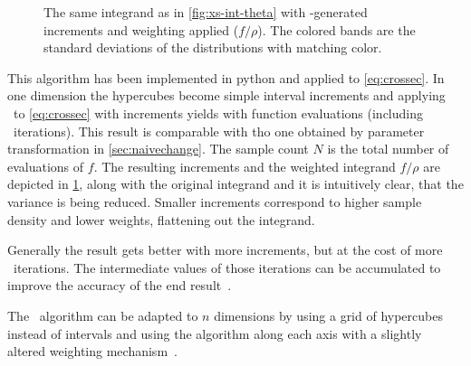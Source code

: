 \begin{figure}[ht]
  \centering {}
  \caption[\(2\pi\dv{\sigma}{\theta}\) scaled to increments found by
  \vegas\ ]{\label{fig:xs-int-vegas} The same integrand as in
    \cref{fig:xs-int-theta} with \vegas-generated increments and
    weighting applied (\(f/\rho\)). The colored bands are the standard
    deviations of the distributions with matching color.}
\end{figure}
%
This algorithm has been implemented in python and applied to
\cref{eq:crossec}.  In one dimension the hypercubes become simple
interval increments and applying \vegas\ to \cref{eq:crossec} with
 increments yields
 with
 function evaluations (including
\vegas\ iterations). This result is comparable with tho one obtained
by parameter transformation in \cref{sec:naivechange}.  The sample
count \(N\) is the total number of evaluations of \(f\). The resulting
increments and the weighted integrand \(f/\rho\) are depicted in
\cref{fig:xs-int-vegas}, along with the original integrand and it is
intuitively clear, that the variance is being reduced. Smaller
increments correspond to higher sample density and lower weights,
flattening out the integrand.

Generally the result gets better with more increments, but at the cost
of more \vegas\ iterations. The intermediate values of those
iterations can be accumulated to improve the accuracy of the end
result~\cite[197]{Lepage:19781an}.

The \vegas\ algorithm can be adapted to \(n\) dimensions by using a
grid of hypercubes instead of intervals and using the algorithm along
each axis with a slightly altered weighting
mechanism~\cite[197]{Lepage:19781an}.

